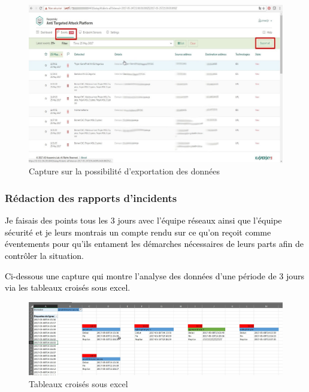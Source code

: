 \begin{figure}[H]
	\begin{center}
		\includegraphics[width=1\linewidth]{Projet_KATA/export_kata}
\end{center}
	\caption{Capture sur la possibilité d'exportation des données}
	\label{fig:10}	
\end{figure}		 
		 
\subsubsection{Rédaction des rapports d’incidents}

\textcolor{black}{Je faisais des points tous les 3 jours avec l’équipe réseaux ainsi que l’équipe sécurité et je leurs montrais un compte rendu sur ce qu’on reçoit comme éventements pour qu’ils entament les démarches nécessaires de leurs parts afin de contrôler la situation.}	

\textcolor{black}{Ci-dessous une capture qui montre l’analyse des données d’une période de 3 jours via les tableaux croisés sous excel.}

\begin{figure}[H]
	\begin{center}
		\includegraphics[width=1\linewidth]{Projet_KATA/rapport_excel}
\end{center}
	\caption{Tableaux croisés sous excel}
	\label{fig:11}	
\end{figure}	
		 		 
